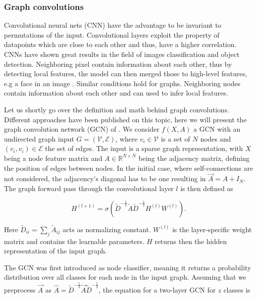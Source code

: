 \subsubsection{Graph convolutions}
\label{ssec:gcn}

Convolutional neural nets (CNN) have the advantage to be invariant to permutations of the input. Convolutional layers exploit the property of datapoints which are close to each other and thus, have a higher correlation. CNNs have shown great results in the field of images classification and object detection. Neighboring pixel contain information about each other, thus by detecting local features, the model can then merged those to high-level features, e.g a face in an image \cite{bishop_pattern_2006}. Similar conditions hold for graphs. Neighboring nodes contain information about each other and can used to infer local features. 

Let us shortly go over the definition and math behind graph convolutions. Different approaches have been published on this topic, here we will present the graph convolution network (GCN) of \cite{kipf_semi-supervised_2017}.
We consider $f(X,A)$ a GCN with an undirected graph input ${G}=(\mathcal{V}, \mathcal{E})$, where $v_{i} \in \mathcal{V}$ is a set of $N$ nodes and  $\left(v_{i}, v_{i}\right) \in \mathcal{E}$ the set of edges. The input is a sparse graph representation, with $X$ being a node feature matrix and $A \in \mathbb{R}^{N \times N}$ being the adjacency matrix, defining the position of edges between nodes. In the initial case, where self-connections are not considered, the adjacency's diagonal has to be one resulting in $\vec{A}=A+I_{N}$. The graph forward pass through the convolutional layer $l$ is then defined as

\begin{equation}
    H^{(l+1)}=\sigma\left(\tilde{D}^{-\frac{1}{2}} \tilde{A} \tilde{D}^{-\frac{1}{2}} H^{(l)} W^{(l)}\right).
\end{equation}

Here $\tilde{D}_{i i}=\sum_{j} \tilde{A}_{i j}$ acts as normalizing constant. $W^{(l)}$ is the layer-specific weight matrix and contains the learnable parameters. $H$ returns then the hidden representation of the input graph.

The GCN was first introduced as node classifier, meaning it returns a probability distribution over all classes for each node in the input graph. Assuming that we preprocess $\vec{A}$ as $\hat{A}=\tilde{D}^{-\frac{1}{2}} \vec{A} \tilde{D}^{-\frac{1}{2}}$, the equation for a two-layer GCN for $z$ classes is

